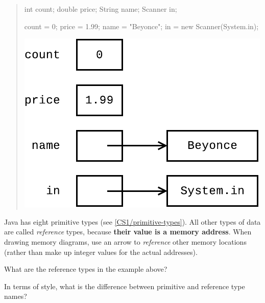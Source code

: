 
\begin{quote}
\begin{minipage}{0.5\linewidth}

\begin{javalst}
int count;
double price;
String name;
Scanner in;

count = 0;
price = 1.99;
name = "Beyonce";
in = new Scanner(System.in);
\end{javalst}

\end{minipage}
\begin{minipage}{0.5\linewidth}

\includegraphics{CS1/reference1.pdf}

\end{minipage}
\end{quote}

Java has eight primitive types (see \ref{CS1/primitive-types}).
All other types of data are called \emph{reference} types, because \textbf{their value is a memory address}.
When drawing memory diagrams, use an arrow to \emph{reference} other memory locations (rather than make up integer values for the actual addresses).




\Q What are the reference types in the example above?

\begin{answer}
\end{answer}


\Q In terms of style, what is the difference between primitive and reference type names?

\begin{answer}
\end{answer}


